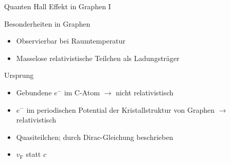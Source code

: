 \documentclass[../defence.tex]{subfiles}
\begin{document}
  \begin{frame}{Quanten Hall Effekt in Graphen I}
    \begin{block}{Besonderheiten in Graphen}
        \pause
        \begin{itemize}
          \item Observierbar bei Raumtemperatur
          \pause
          \item Masselose relativistische Teilchen als Ladungsträger
        \end{itemize}
    \end{block}
    \pause
    \begin{block}{Ursprung}
      \pause
      \begin{itemize}
        \item Gebundene $e^-$ im C-Atom $\rightarrow$ nicht relativistisch
        \pause
        \item $e^-$ im periodischen Potential der Kristallstruktur von Graphen $\rightarrow$ relativistisch
        \pause
        \item Quasiteilchen; durch Dirac-Gleichung beschrieben
        \pause
        \item $v_\mathrm{F}$ statt $c$
      \end{itemize}
    \end{block}
  \end{frame}
\end{document}
